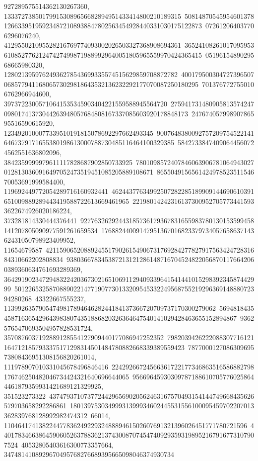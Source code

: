 {{{927289575514362130267360, 133372738501799153089656682894951433414800210189315\
50814870545954601378126633951959234872108938847802563454928440331030175122873\
072612064037706296076240, 412955021095528216769774093002026503327368908694361\
36524108261017095953610852776212474274998719889929640051805965559970424365415\
0519615489029568665980320, 12802139597624936278543699335574515629859708872782\
40017950030472739650706857794116806573029818643532136232292177070087250180295\
7013767727550106762966944600, 39737223005710641535345903404221559588945564720\
27594173148090581357424709801741373044263948057684808167337085603920178848173\
24767405799890786595516590615920, 1234920100077339510191815078692297662493345\
90076483800927572097545221416467379171655380198613000788730485116464100329385\
58427338474090644560724562551636802096, 3842359999979611117828687902850733925\
78010985724078460639067810649430270128130360916497052473519451085205889108671\
865504915656142497852351154670053691999584400, 119692449772054289716160932441\
46244377634992507282285189909144690610391651009889289443419588722613669461965\
221980142423161373009527057734415933622674926020186224, 373281814330444376441\
92776326292443185736179367831655983780130153599458141207805090977591261659534\
1768824400914795136701682337973405765863714362431050798923409952, 11654679587\
42115906520889245517902615490673176928427782791756342472831684310662202808834\
9380366783453872131212861487167045248220568701176642060389360634761693289369, 
   36429190234729483224203673021651069112940933964154144101529839234587442999\
50122653258708890221477190773013320954533224956875521929636914888072394280268\
43322667555237, 1139926357905474981789464628244184137366720709737170300279062\
56948184354587163654296439838074351886820326364647540141029428463655152894867\
93625765470693504957828531724, 3570876037192889128554127909440177086947252352\
79820394262220883077161211647121857933375171298314501484780882668339389559423\
787700012708630969573808436951308156820261014, 111978907010331045678496846416\
22429266724566361722177346863516586882798176746250482046734424321640696644065\
956696459303097871886107057760258644461879359931421689121329925, 351523273322\
43747937107377244296569020562463167570493154144749668435626579703658292286861\
18013975303499931399934602445531556100095459702207013362839768128992982474312\
66014, 1104641741382244778362492293248889461502607691321396026451771780721596\
44017834663864590605263788362137430087074547409293593198952167916773107907524\
40532805403616300773357664, 3474814108929670495768276689395665098046374930734\
}}}
